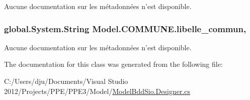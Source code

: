 Aucune documentation sur les métadonnées n'est disponible. 

\hypertarget{class_model_1_1_c_o_m_m_u_n_e_a7e5b6345cd53c93bc68aadbf0846038d}{
\subsubsection[{libelle\-\_\-commun}]{\setlength{\rightskip}{0pt plus 5cm}global.\-System.\-String Model.\-C\-O\-M\-M\-U\-N\-E.\-libelle\-\_\-commun\hspace{0.3cm}{\ttfamily [get]}, {\ttfamily [set]}}}\label{class_model_1_1_c_o_m_m_u_n_e_a7e5b6345cd53c93bc68aadbf0846038d}


Aucune documentation sur les métadonnées n'est disponible. 



The documentation for this class was generated from the following file\-:\begin{DoxyCompactItemize}
\item 
C\-:/\-Users/dju/\-Documents/\-Visual Studio 2012/\-Projects/\-P\-P\-E/\-P\-P\-E3/\-Model/\hyperlink{_model_bdd_sio_8_designer_8cs}{Model\-Bdd\-Sio.\-Designer.\-cs}\end{DoxyCompactItemize}
